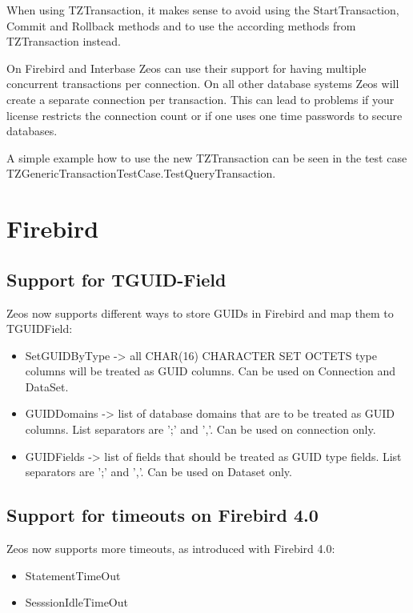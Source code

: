 \documentclass[a4paper,12pt,oneside]{article}
\begin{document}
When using TZTransaction, it makes sense to avoid using the StartTransaction, Commit and Rollback methods and to use the according methods from TZTransaction instead.

On Firebird and Interbase Zeos can use their support for having multiple concurrent transactions per connection.
On all other database systems Zeos will create a separate connection per transaction.
This can lead to problems if your license restricts the connection count or if one uses one time passwords to secure databases.

A simple example how to use the new TZTransaction can be seen in the test case TZGenericTransactionTestCase.TestQueryTransaction.


\section{Firebird}

\subsection{Support for TGUID-Field}
Zeos now supports different ways to store GUIDs in Firebird and map them to TGUIDField:
\begin{itemize}
  \item SetGUIDByType -> all CHAR(16) CHARACTER SET OCTETS type columns will be treated as GUID columns. Can be used on Connection and DataSet.
  \item GUIDDomains -> list of database domains that are to be treated as GUID columns. List separators are ';' and ','. Can be used on connection only.
  \item GUIDFields -> list of fields that should be treated as GUID type fields. List separators are ';' and ','. Can be used on Dataset only.
\end{itemize}

\subsection{Support for timeouts on Firebird 4.0}
Zeos now supports more timeouts, as introduced with Firebird 4.0:
\begin{itemize}
  \item StatementTimeOut
  \item SesssionIdleTimeOut
\end{itemize}
\end{document}
